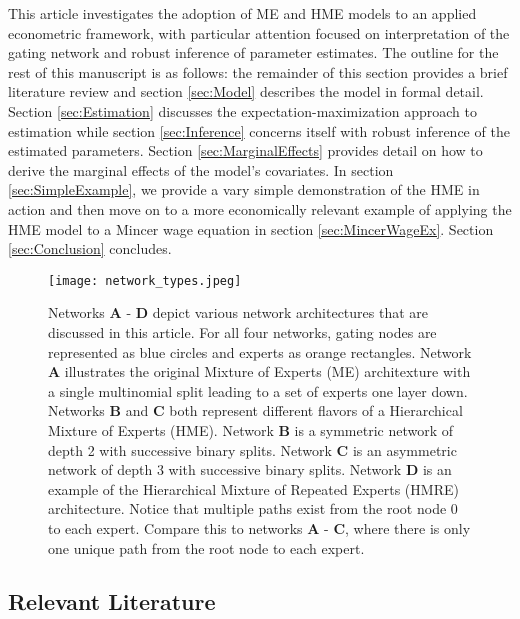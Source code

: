 \documentclass[12pt]{article}
\begin{document}
This article investigates the adoption of ME and HME models to an applied
econometric framework, with particular attention focused on interpretation of
the gating network and robust inference of parameter estimates. The outline for the
rest of this manuscript is as follows: the remainder of this section
provides a brief literature review and section \ref{sec:Model} describes
the model in formal detail. Section \ref{sec:Estimation} discusses the
expectation-maximization approach to estimation while section \ref{sec:Inference}
concerns itself with robust inference of the estimated parameters.
Section \ref{sec:MarginalEffects} provides detail on how to derive the
marginal effects of the model's covariates. In section \ref{sec:SimpleExample},
we provide a vary simple demonstration of the HME in action and then
move on to a more economically relevant example of applying the HME model to
a Mincer wage equation in section \ref{sec:MincerWageEx}. Section
\ref{sec:Conclusion} concludes.

\begin{figure}[!ht]
  \centering
  \texttt{[image: network\_types.jpeg]}
  \caption{Networks \textbf{A} - \textbf{D} depict various network
  architectures that are discussed in this article. For all four networks,
  gating nodes are represented as blue circles and experts as orange
  rectangles. Network \textbf{A} illustrates the original Mixture of
  Experts (ME) architexture with a single multinomial split leading
  to a set of experts one layer down. Networks \textbf{B} and \textbf{C} both
  represent different flavors of a Hierarchical Mixture of Experts (HME). Network
  \textbf{B} is a symmetric network of depth 2 with successive binary splits.
  Network \textbf{C} is an asymmetric network of depth 3 with successive
  binary splits. Network \textbf{D} is an example of the Hierarchical
  Mixture of Repeated Experts (HMRE) architecture. Notice that multiple paths
  exist from the root node $0$ to each expert. Compare this to networks
  \textbf{A} - \textbf{C}, where there is only one unique path from the root
  node to each expert.}
  \label{fig:network_comparison}
\end{figure}


\subsection{Relevant Literature}
\end{document}
